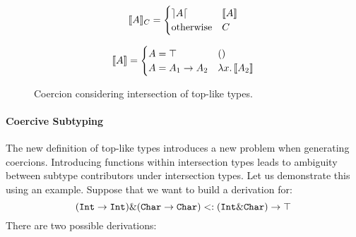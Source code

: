 \begin{figure}[t]
  \[
  \llbracket A \rrbracket_{C} = 
  \begin{cases} 
        \rceil A \lceil & \llbracket A \rrbracket \\ 
        \text{otherwise} & {C} 
  \end{cases}
  \]

  \[
  \llbracket A \rrbracket = 
  \begin{cases} 
        A = \top & () \\
        A = A_1 \to A_2 & \lambda x.\, \llbracket A_2 \rrbracket \\
  \end{cases}
  \]


  \caption{Coercion considering intersection of top-like types.}
  \label{fig:andcoercion}
\end{figure}


\paragraph{Coercive Subtyping}
The new definition of top-like types introduces a new problem when generating coercions. 
Introducing functions within intersection types leads to ambiguity between subtype contributors 
under intersection types.
Let us demonstrate this using an example.
Suppose that we want to build a derivation for:  
\[(\texttt{Int} \to \texttt{Int}) \& (\texttt{Char} \to \texttt{Char}) <: (\texttt{Int} \& \texttt{Char}) \to \top\]
There are two possible derivations: 

